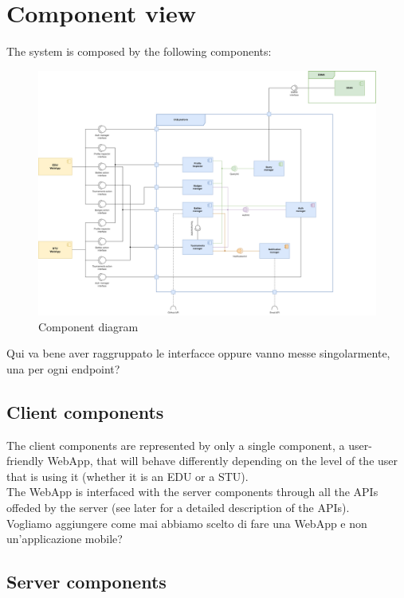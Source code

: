 \section{Component view}
The system is composed by the following components:

\begin{figure}[H]
    \centering
    \includegraphics[width=\textwidth]{images/diagrams/component_diagram.png}
    \caption{Component diagram}
\end{figure}

{\color{red}Qui va bene aver raggruppato le interfacce oppure vanno messe singolarmente, una per ogni endpoint?}

\subsection{Client components}

The client components are represented by only a single component, a user-friendly WebApp, that will behave differently depending on the level of the user that is using it (whether it is an EDU or a STU).\\
The WebApp is interfaced with the server components through all the APIs offeded by the server (see later for a detailed description of the APIs).\\
{\color{red}Vogliamo aggiungere come mai abbiamo scelto di fare una WebApp e non un'applicazione mobile?}

\subsection{Server components}

